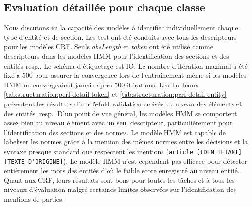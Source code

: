 \subsection{Evaluation détaillée pour chaque classe}
Nous discutons ici la capacité des modèles à identifier individuellement chaque type d'entité et de section. Les test ont été conduits avec tous les descripteurs pour les modèles CRF. Seuls \textit{absLength} et \textit{token} ont été utilisé comme descripteurs dans les modèles HMM pour l'identification des sections et des entités resp.. Le schéma d'étiquetage est IO. Le nombre d'itération maximal a été fixé à 500 pour assurer la convergence lors de l'entrainement même si les modèles HMM ne convergeaient jamais après 500 itérations. Les Tableaux \ref{tab:structuration:perf-detail-token} et \ref{tab:structuration:perf-detail-entity} présentent les résultats d'une 5-fold validation croisée au niveau des éléments et des entités, resp.. D'un point de vue général, les modèles HMM se comportent assez bien au niveau élément avec un seul descripteur, particulièrement pour l'identification des sections et des normes. Le modèle HMM est capable de labeliser les normes grâce à la mention des mêmes normes entre les décisions et la syntaxe presque standard que respectent les mentions (\verb=article [IDENTIFIANT] [TEXTE D'ORIGINE]=). Le modèle HMM n'est cependant pas efficace pour détecter entièrement les mots des entités d'où le faible score enregistré au niveau entité. Quant aux CRF, leurs résultats sont bons pour toutes les tâches et à tous les niveaux d'évaluation malgré certaines limites observées sur l'identification des mentions de parties.

